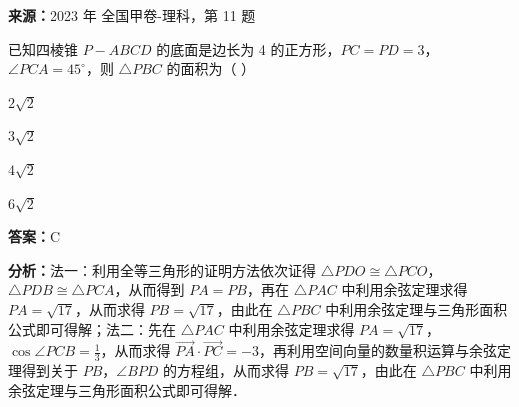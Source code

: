 \begin{question}[points=5]
\textbf{来源：}2023 年 全国甲卷-理科，第 11 题\par
已知四棱锥 $P-ABCD$ 的底面是边长为 4 的正方形，$PC = PD = 3$，$\angle PCA = 45^\circ$，则 $\triangle PBC$ 的面积为（         ）
\begin{choices}
  \item $2\sqrt{2}$
  \item $3\sqrt{2}$
  \item $4\sqrt{2}$
  \item $6\sqrt{2}$
\end{choices}
\begin{solution}
\textbf{答案：}C

\textbf{分析：}法一：利用全等三角形的证明方法依次证得 $\triangle PDO \cong \triangle PCO$，$\triangle PDB \cong \triangle PCA$，从而得到 $PA = PB$，再在 $\triangle PAC$ 中利用余弦定理求得 $PA = \sqrt{17}$，从而求得 $PB = \sqrt{17}$，由此在 $\triangle PBC$ 中利用余弦定理与三角形面积公式即可得解；法二：先在 $\triangle PAC$ 中利用余弦定理求得 $PA = \sqrt{17}$，$\cos \angle PCB = \frac{1}{3}$，从而求得 $\overrightarrow{PA}\cdot\overrightarrow{PC} = -3$，再利用空间向量的数量积运算与余弦定理得到关于 $PB$，$\angle BPD$ 的方程组，从而求得 $PB = \sqrt{17}$，由此在 $\triangle PBC$ 中利用余弦定理与三角形面积公式即可得解．


\end{solution}
\end{question}
